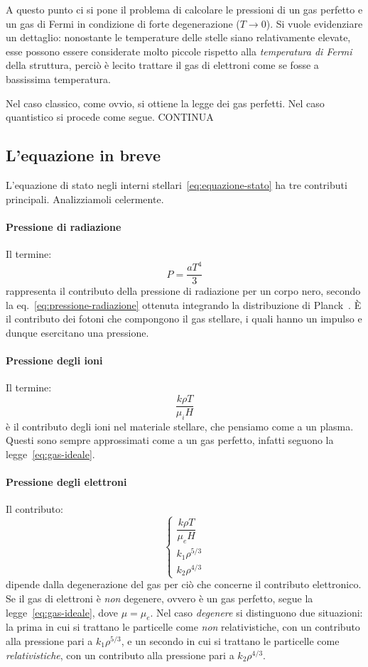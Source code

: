 A questo punto ci si pone il problema di calcolare le pressioni di un gas perfetto e un gas di Fermi in condizione di forte degenerazione ($T \to 0$). Si vuole evidenziare un dettaglio: nonostante le temperature delle stelle siano relativamente elevate, esse possono essere considerate molto piccole rispetto alla \emph{temperatura di Fermi} della struttura, perciò è lecito trattare il gas di elettroni come se fosse a bassissima temperatura. 

Nel caso classico, come ovvio, si ottiene la legge dei gas perfetti. Nel caso quantistico si procede come segue. CONTINUA


\subsection{L'equazione in breve}
L'equazione di stato negli interni stellari~\eqref{eq:equazione-stato} ha tre contributi principali. Analizziamoli celermente.

\paragraph{Pressione di radiazione}
Il termine:
\[
P = \dfrac{aT^4}{3}
\]
rappresenta il contributo della pressione di radiazione per un corpo nero, secondo la eq.~\eqref{eq:pressione-radiazione} ottenuta integrando la distribuzione di Planck~. È il contributo dei fotoni che compongono il gas stellare, i quali hanno un impulso e dunque esercitano una pressione.

\paragraph{Pressione degli ioni}
Il termine:
\[
\dfrac{k \rho T}{\mu_i H}
\]
è il contributo degli ioni nel materiale stellare, che pensiamo come a un plasma. Questi sono sempre approssimati come a un gas perfetto, infatti seguono la legge~\eqref{eq:gas-ideale}.

\paragraph{Pressione degli elettroni}
Il contributo:
\[
\begin{cases} 
    \dfrac{k \rho T}{\mu_e H} \\ 
    k_1 \rho^{5/3} \\ 
    k_2 \rho^{4/3}
    \end{cases}
\]
dipende dalla degenerazione del gas per ciò che concerne il contributo elettronico. Se il gas di elettroni è \emph{non} degenere, ovvero è un gas perfetto, segue la legge~\eqref{eq:gas-ideale}, dove $\mu = \mu_e$. Nel caso \emph{degenere} si distinguono due situazioni: la prima in cui si trattano le particelle come \emph{non} relativistiche, con un contributo alla pressione pari a $k_1 \rho^{5/3}$, e un secondo in cui si trattano le particelle come \emph{relativistiche}, con un contributo alla pressione pari a $k_2 \rho^{4/3}$.

